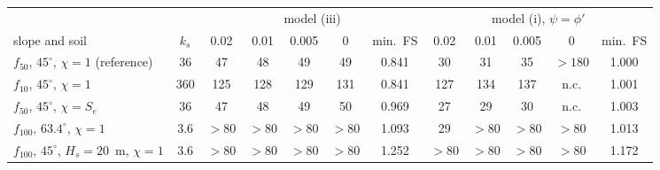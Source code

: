\begin{tabular}{lc ccccc ccccc}
\toprule
 & & \multicolumn{5}{c}{model (iii)} & \multicolumn{5}{c}{model (i), $\psi=\phi'$}\\
\cmidrule(lr){3-7}\cmidrule(lr){8-12}
slope and soil & $k_s$ & 0.02 & 0.01 & 0.005 & 0 & min.\ FS & 0.02 & 0.01 & 0.005 & 0 & min.\ FS\\
\midrule
$f_{50}$, $45^\circ$, $\chi=1$ (reference) & 36 & 47 & 48 & 49 & 49 & 0.841 & 30 & 31 & 35 & $>180$ & 1.000\\
$f_{10}$, $45^\circ$, $\chi=1$ & 360 & 125 & 128 & 129 & 131 & 0.841 & 127 & 134 & 137 & n.c. & 1.001\\
$f_{50}$, $45^\circ$, $\chi=S_e$ & 36 & 47 & 48 & 49 & 50 & 0.969 & 27 & 29 & 30 & n.c. & 1.003\\
$f_{100}$, $63.4^\circ$, $\chi=1$ & 3.6 & $>80$ & $>80$ & $>80$ & $>80$ & 1.093 & 29 & $>80$ & $>80$ & $>80$ & 1.013\\
$f_{100}$, $45^\circ$, $H_s=20$~m, $\chi=1$ & 3.6 & $>80$ & $>80$ & $>80$ & $>80$ & 1.252 & $>80$ & $>80$ & $>80$ & $>80$ & 1.172\\
\bottomrule
\end{tabular}
